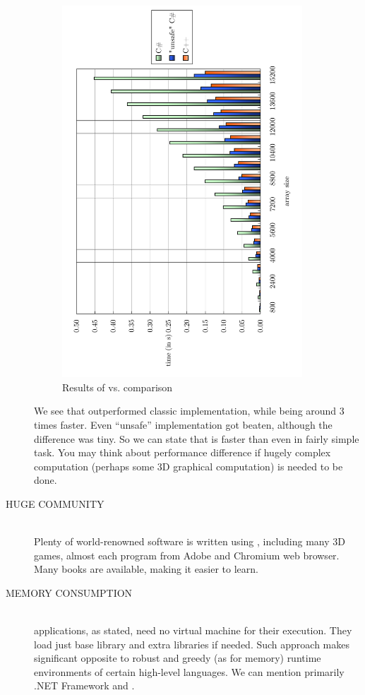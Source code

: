 \begin{description}
\begin{figure}[ht]
\caption{Results of \cpp vs. \csharp comparison}\label{figure:comparison}
\centering\includegraphics[width=9cm,angle=-90]{graphics/laboratory/00-langcomparison.pdf}
\end{figure}

We see that \cpp outperformed classic \csharp implementation, while being a\-round 3 times faster. Even \enquote{unsafe} \csharp implementation got beaten, although the difference was tiny. So we can state that \cpp is faster than \csharp even in fairly simple task. You may think about performance difference if hugely complex computation (perhaps some 3D graphical computation) is needed to be done.

\item[HUGE COMMUNITY\ts{\textcolor{YellowOrange}{great}}]\hfill \\
Plenty of world-renowned software is written using \cpp, including many 3D games, almost each program from Adobe and Chromium web browser. Many \cpp books are available, making it easier to learn.

\item[MEMORY CONSUMPTION\ts{\textcolor{ultragreen}{good}}]\hfill \\
\cpp applications, as stated, need no virtual machine for their execution. They load just base \cpp library and extra libraries if needed. Such approach makes significant opposite to robust and greedy (as for memory) runtime environments of certain high-level languages. We can mention primarily .NET Framework and .


\end{description}

